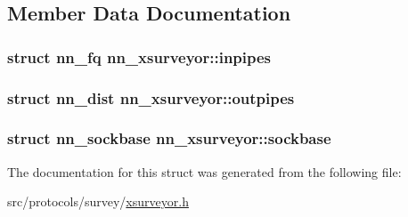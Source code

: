 \subsection{Member Data Documentation}
\subsubsection[{inpipes}]{\setlength{\rightskip}{0pt plus 5cm}struct {\bf nn\+\_\+fq} nn\+\_\+xsurveyor\+::inpipes}\hypertarget{structnn__xsurveyor_a22880899a5fc576ce14d537d72010317}{}\label{structnn__xsurveyor_a22880899a5fc576ce14d537d72010317}
\subsubsection[{outpipes}]{\setlength{\rightskip}{0pt plus 5cm}struct {\bf nn\+\_\+dist} nn\+\_\+xsurveyor\+::outpipes}\hypertarget{structnn__xsurveyor_af4b29b3a1eff8803e7476ffe26fbdd65}{}\label{structnn__xsurveyor_af4b29b3a1eff8803e7476ffe26fbdd65}
\subsubsection[{sockbase}]{\setlength{\rightskip}{0pt plus 5cm}struct {\bf nn\+\_\+sockbase} nn\+\_\+xsurveyor\+::sockbase}\hypertarget{structnn__xsurveyor_a74031df742a38c6180ff842bf50be7ba}{}\label{structnn__xsurveyor_a74031df742a38c6180ff842bf50be7ba}


The documentation for this struct was generated from the following file\+:\begin{DoxyCompactItemize}
\item 
src/protocols/survey/\hyperlink{xsurveyor_8h}{xsurveyor.\+h}\end{DoxyCompactItemize}
